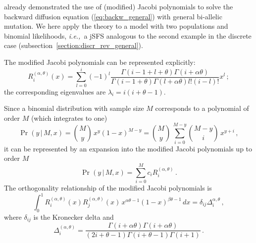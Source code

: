 \documentclass[preprint]{elsarticle}
\newcommand\given{{\,|\,}}
\newcommand\ie{{\it i.e.,}}
\begin{document}
\citet{Song12} already demonstrated the use of (modified) Jacobi polynomials to solve the backward diffusion equation (\ref{eq:backw_general}) with general bi-allelic mutation. We here apply the theory to a model with two populations and binomial likelihoods, \ie\ a jSFS analogous to the second example in the discrete case (subsection~\ref{section:discr_rev_general}). 

The modified Jacobi polynomials can be represented explicitly:
\begin{equation}
  R_i^{(\alpha,\theta)}(x)=\sum_{l=0}^i(-1)^l\frac{\Gamma(i-1+l+\theta)\Gamma(i+\alpha\theta)}{\Gamma(i-1+\theta)\Gamma(l+\alpha\theta)l!(i-l)!}x^l\,;
\end{equation}
the corresponding eigenvalues are $\lambda_i=i(i+\theta-1)$. 

Since a binomial distribution with sample size $M$ corresponds to a polynomial of order $M$ (which integrates to one) 
\begin{equation}
\Pr(y\given M,x)=\binom{M}{y}\,x^{y}(1-x)^{M-y}
=\binom{M}{y}\,\sum_{i=0}^{M-y} \binom{M-y}{i}\,x^{y+i}\,,
\end{equation}
it can be represented by an expansion into the modified Jacobi polynomials up to order $M$
\begin{equation}
\Pr(y\given M,x)=\sum_{i=0}^M c_i R_i^{(\alpha,\theta)}\,.
\end{equation}
The orthogonality relationship of the modified Jacobi polynomials is
\begin{equation}
    \int_0^1 R_i^{(\alpha,\theta)}(x) R_j^{(\alpha,\theta)}(x)\, x^{\alpha\theta-1}(1-x)^{\beta\theta-1}\,dx=\delta_{ij} \Delta_i^{\alpha,\theta}\,,
\end{equation}
where $\delta_{ij}$ is the Kronecker delta and 
\begin{equation}
    \Delta_i^{(\alpha,\theta)}=\frac{\Gamma(i+\alpha\theta)\Gamma(i+\alpha\theta)}{(2i+\theta-1)\Gamma(i+\theta-1)\Gamma(i+1)}\,.
\end{equation}
\end{document}
